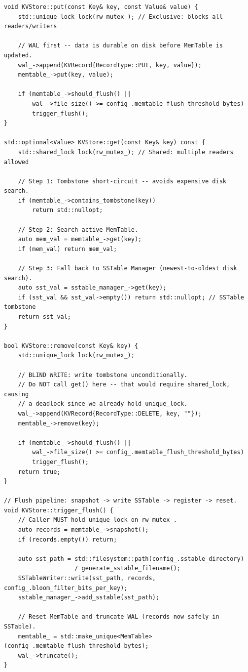 \documentclass[11pt,a4paper]{article}
\begin{document}
\begin{lstlisting}[style=cpp, caption={Thread-Safe Write and Read Paths: \texttt{src/kvstore.cpp}}]
void KVStore::put(const Key& key, const Value& value) {
    std::unique_lock lock(rw_mutex_); // Exclusive: blocks all readers/writers

    // WAL first -- data is durable on disk before MemTable is updated.
    wal_->append(KVRecord{RecordType::PUT, key, value});
    memtable_->put(key, value);

    if (memtable_->should_flush() ||
        wal_->file_size() >= config_.memtable_flush_threshold_bytes)
        trigger_flush();
}

std::optional<Value> KVStore::get(const Key& key) const {
    std::shared_lock lock(rw_mutex_); // Shared: multiple readers allowed

    // Step 1: Tombstone short-circuit -- avoids expensive disk search.
    if (memtable_->contains_tombstone(key))
        return std::nullopt;

    // Step 2: Search active MemTable.
    auto mem_val = memtable_->get(key);
    if (mem_val) return mem_val;

    // Step 3: Fall back to SSTable Manager (newest-to-oldest disk search).
    auto sst_val = sstable_manager_->get(key);
    if (sst_val && sst_val->empty()) return std::nullopt; // SSTable tombstone
    return sst_val;
}

bool KVStore::remove(const Key& key) {
    std::unique_lock lock(rw_mutex_);

    // BLIND WRITE: write tombstone unconditionally.
    // Do NOT call get() here -- that would require shared_lock, causing
    // a deadlock since we already hold unique_lock.
    wal_->append(KVRecord{RecordType::DELETE, key, ""});
    memtable_->remove(key);

    if (memtable_->should_flush() ||
        wal_->file_size() >= config_.memtable_flush_threshold_bytes)
        trigger_flush();
    return true;
}

// Flush pipeline: snapshot -> write SSTable -> register -> reset.
void KVStore::trigger_flush() {
    // Caller MUST hold unique_lock on rw_mutex_.
    auto records = memtable_->snapshot();
    if (records.empty()) return;

    auto sst_path = std::filesystem::path(config_.sstable_directory)
                    / generate_sstable_filename();
    SSTableWriter::write(sst_path, records, config_.bloom_filter_bits_per_key);
    sstable_manager_->add_sstable(sst_path);

    // Reset MemTable and truncate WAL (records now safely in SSTable).
    memtable_ = std::make_unique<MemTable>(config_.memtable_flush_threshold_bytes);
    wal_->truncate();
}
\end{lstlisting}
\end{document}
